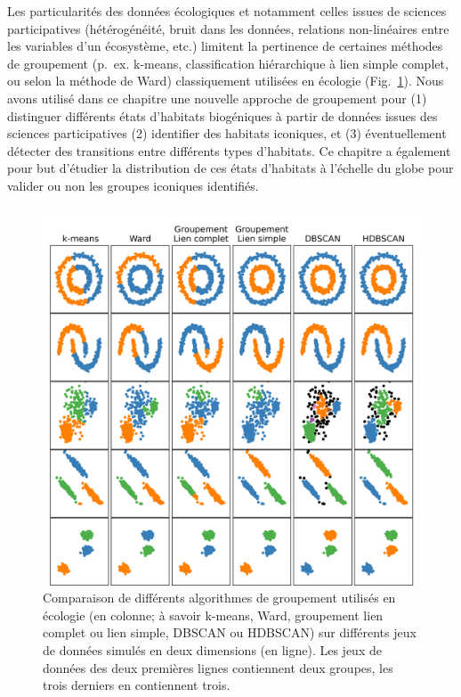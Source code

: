 \begin{refsection}
Les particularités des données écologiques et notamment celles issues de
sciences participatives (hétérogénéité, bruit dans les données,
relations non-linéaires entre les variables d'un écosystème, etc.)
limitent la pertinence de certaines méthodes de groupement (p.~ex.
k-means, classification hiérarchique à lien simple complet, ou selon la
méthode de Ward) classiquement utilisées en écologie
(Fig.~\ref{fig:chap2chapo1}). Nous avons utilisé dans ce chapitre une
nouvelle approche de groupement pour (1) distinguer différents états
d'habitats biogéniques à partir de données issues des sciences
participatives (2) identifier des habitats iconiques, et (3)
éventuellement détecter des transitions entre différents types
d'habitats. Ce chapitre a également pour but d'étudier la distribution
de ces états d'habitats à l'échelle du globe pour valider ou non les
groupes iconiques identifiés.

\begin{figure}
\hypertarget{fig:chap2chapo1}{%
\centering
\includegraphics{03-Chapitre2/figures/synthetic_clustering_perf.png}
\caption[Comparaison de différents algorithmes de groupement utilisés en
écologie.]{Comparaison de différents algorithmes de groupement utilisés en
écologie (en colonne; à savoir k-means, Ward, groupement lien complet ou
lien simple, \mbox{DBSCAN} ou \mbox{HDBSCAN}) sur différents jeux de données simulés
en deux dimensions (en ligne). Les jeux de données des deux premières
lignes contiennent deux groupes, les trois derniers en contiennent
trois.}\label{fig:chap2chapo1}
}
\end{figure}


\end{refsection}
